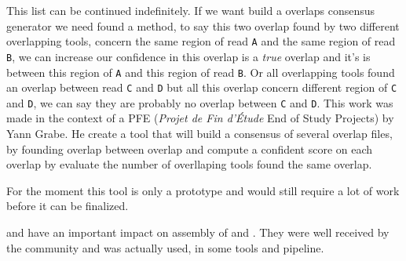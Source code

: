 \documentclass[main.tex]{subfiles}
\begin{document}
This list can be continued indefinitely. If we want build a overlaps consensus generator we need found a method, to say this two overlap found by two different overlapping tools, concern the same region of read \texttt{A} and the same region of read \texttt{B}, we can increase our confidence in this overlap is a \textit{true} overlap and it's is between this region of \texttt{A} and this region of read \texttt{B}. Or all overlapping tools found an overlap between read \texttt{C} and \texttt{D} but all this overlap concern different region of \texttt{C} and \texttt{D}, we can say they are probably no overlap between \texttt{C} and \texttt{D}.
This work was made in the context of a PFE (\textit{Projet de Fin d'Étude} End of Study Projects) by Yann Grabe. He create a tool that will build a consensus of several overlap files, by founding overlap between overlap and compute a confident score on each overlap by evaluate the number of overllaping tools found the same overlap.

For the moment this tool is only a prototype and would still require a lot of work before it can be finalized. 

\yacrd and \fpa have an important impact on assembly of \miniasm and \wtdbg. They were well received by the community \yacrd and \fpa was actually used, in some tools and pipeline.


%
%
\end{document}
